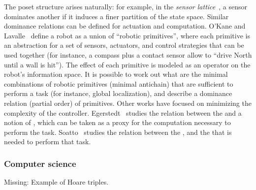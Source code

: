 The poset structure arises naturally: for example, in the \emph{sensor
lattice}~\cite{lavalle12sensing}, a sensor dominates another
if it induces a finer partition of the state space. Similar dominance
relations can be defined for actuation and computation. O'Kane and
Lavalle~\cite{okane08comparing} define a robot as a union of ``robotic
primitives'', where each primitive is an abstraction for a set of
sensors, actuators, and control strategies that can be used together
(for instance, a compass plus a contact sensor allow to ``drive North until
a wall is hit''). The effect of each primitive is modeled as an operator
on the robot's information space. It is possible to work out what
are the minimal combinations of robotic primitives (minimal antichain)
that are sufficient to perform a task (for instance, global localization),
and describe a dominance relation (partial order) of primitives. Other
works have focused on minimizing the complexity of the controller.
Egerstedt~\cite{egerstedt03motion} studies the relation between
the  and a notion of , which can be taken as
a proxy for the computation necessary to perform the task. Soatto~\cite{soatto11steps}
studies the relation between the ,
and the  that is needed to perform that
task.

\subsubsection{Computer science}

\begin{publictodo}
    Missing: Example of Hoare triples.
\end{publictodo}


